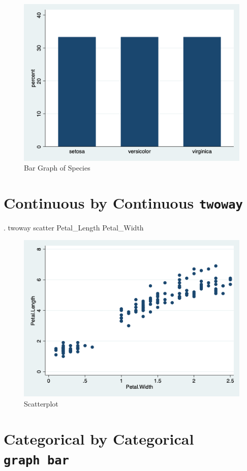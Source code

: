 \documentclass[
]{article}
\begin{document}
\begin{figure}
\centering
\includegraphics[width=0.75\linewidth]{mybargraph.png}
\caption{Bar Graph of Species}
\end{figure}

\hypertarget{continuous-by-continuous-twoway}{%
\section{\texorpdfstring{Continuous by Continuous
\texttt{twoway}}{Continuous by Continuous twoway}}\label{continuous-by-continuous-twoway}}

\begin{stlog}
. twoway scatter Petal_Length Petal_Width
\end{stlog}



\begin{figure}
\centering
\includegraphics[width=0.75\linewidth]{myscatter.png}
\caption{Scatterplot}
\end{figure}

\hypertarget{categorical-by-categorical-graph-bar}{%
\section{\texorpdfstring{Categorical by Categorical
\texttt{graph\ bar}}{Categorical by Categorical graph bar}}\label{categorical-by-categorical-graph-bar}}
\end{document}
